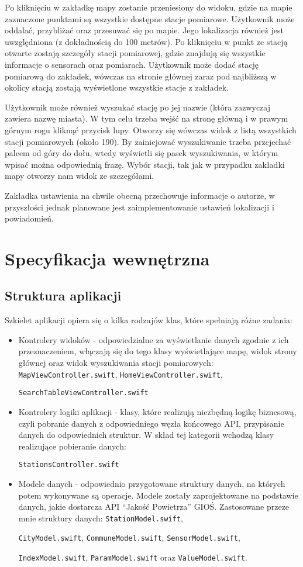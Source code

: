 \documentclass[a4paper,11pt,titlepage]{article}
\begin{document}
Po kliknięciu w zakładkę mapy zostanie przeniesiony do widoku, gdzie na mapie zaznaczone punktami są wszystkie dostępne stacje pomiarowe. Użytkownik może oddalać, przybliżać oraz przesuwać się po mapie. Jego lokalizacja również jest uwzględniona (z dokładnością do 100 metrów). Po kliknięciu w punkt ze stacją otwarte zostają szczegóły stacji pomiarowej, gdzie znajdują się wszystkie informacje o sensorach oraz pomiarach. Użytkownik może dodać stację pomiarową do zakładek, wówczas na stronie głównej zaraz pod najbliższą w okolicy stacją zostają wyświetlone wszystkie stacje z zakładek.

Użytkownik może również wyszukać stację po jej nazwie (która zazwyczaj zawiera nazwę miasta). W tym celu trzeba wejść na stronę główną i w prawym górnym rogu kliknąć przycisk lupy. Otworzy się wówczas widok z listą wszystkich stacji pomiarowych (około 190). By zainicjować wyszukiwanie trzeba przejechać palcem od góry do dołu, wtedy wyświetli się pasek wyszukiwania, w którym wpisać można odpowiednią frazę. Wybór stacji, tak jak w przypadku zakładki mapy otworzy nam widok ze szczegółami.

Zakładka ustawienia na chwile obecną przechowuje informacje o autorze, w przyszłości jednak planowane jest zaimplementowanie ustawień lokalizacji i powiadomień.

\section{Specyfikacja wewnętrzna}
\subsection{Struktura aplikacji}
Szkielet aplikacji opiera się o kilka rodzajów klas, które spełniają różne zadania:
\begin{itemize}
 	\item Kontrolery widoków - odpowiedzialne za wyświetlanie danych zgodnie z ich przeznaczeniem, włączają się do tego klasy wyświetlające mapę, widok strony głównej oraz widok wyszukiwania stacji pomiarowych:  \verb|MapViewController.swift|,  \verb|HomeViewController.swift|, 
 
\verb|SearchTableViewController.swift|
	\item Kontrolery logiki aplikacji - klasy, które realizują niezbędną logikę biznesową, czyli pobranie danych z odpowiedniego węzła końcowego API, przypisanie danych do odpowiednich struktur. W skład tej kategorii wchodzą klasy realizujące pobieranie danych:

 \verb|StationsController.swift|
	\item Modele danych - odpowiednio przygotowane struktury danych, na których potem wykonywane są operacje. Modele zostały zaprojektowane na podstawie danych, jakie dostarcza API ``Jakość Powietrza'' GIOŚ. Zastosowane przeze mnie struktury danych:  \verb|StationModel.swift|,  

\verb|CityModel.swift|,  \verb|CommuneModel.swift|,  \verb|SensorModel.swift|,  

\verb|IndexModel.swift|,  \verb|ParamModel.swift| oraz  \verb|ValueModel.swift|. 
\end{itemize}
\end{document}
